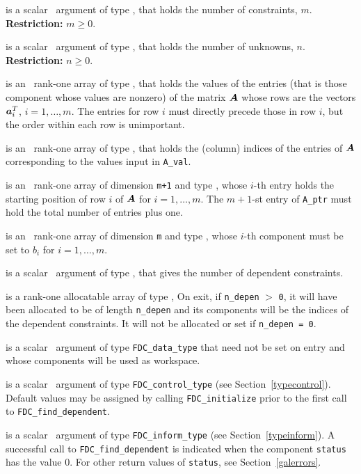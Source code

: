 \documentclass{galahad}
\newcommand{\packagename}{FDC}
\begin{document}
\begin{description}

 is a scalar \intentin\ argument of type \integer,
that holds the number of constraints, $m$.
{\bf Restriction: } $m \geq 0$.

 is a scalar \intentin\ argument of type \integer,
that holds the number of unknowns, $n$.
{\bf Restriction: } $n \geq 0$.

 is an \intentin\ rank-one array of type \realdp, that holds
the values of the entries (that is those component whose values are nonzero)
of the matrix ${\bm{A}}$ whose rows are the vectors ${\bm{a}}_i^T$, $i = 1, \ldots, m$.
The entries for row $i$ must directly precede those in row $i$, but the
order within each row is unimportant.

 is an \intentin\ rank-one array of type \integer, that 
holds the (column) indices of the entries of ${\bm{A}}$ corresponding to the
values input in {\tt A\_val}.

 is an \intentin\ rank-one array of dimension {\tt m+1} and type
\integer, whose $i$-th entry holds the starting position of row $i$
of ${\bm{A}}$ for $i = 1, \ldots, m$. The $m+1$-st entry of {\tt A\_ptr}
must hold the total number of entries plus one.

 is an \intentin\ rank-one array of dimension {\tt m} and
type \realdp, whose $i$-th component must be set to $b_i$ for
$i = 1, \ldots, m$.

 is a scalar \intentout\ argument of type \integer,
that gives the number of dependent constraints.

 is a rank-one allocatable array of type \integer,
On exit, if {\tt n\_depen} $>$ {\tt 0}, it will have been allocated to be of
length {\tt n\_depen} and its components will be the indices of the dependent
constraints. It will not be allocated or set if {\tt n\_depen = 0}.

 is a scalar \intentinout\ argument of type
{\tt \packagename\_data\_type}
that need not be set on entry and whose components will be used as workspace.

 is a scalar \intentin\ argument of type
{\tt \packagename\_control\_type}
(see Section~\ref{typecontrol}). Default values may be assigned by calling
{\tt \packagename\_initialize} prior to the first call to
{\tt \packagename\_find\_dependent}.

 is a scalar \intentinout\ argument of type
{\tt \packagename\_inform\_type}
(see Section~\ref{typeinform}). A successful call to
{\tt \packagename\_find\_dependent}
is indicated when the  component {\tt status} has the value 0.
For other return values of {\tt status}, see Section~\ref{galerrors}.

\end{description}
\end{document}
